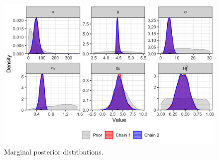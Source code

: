 \documentclass[]{article}
\begin{document}
\begin{doublespace}
\begin{figure}[H]
	\centering
		\includegraphics[width=\linewidth]{figures/poumm_parameter_estimates.png}
		\caption{Marginal posterior distributions.}
\label{fig:poumm-parameters}
\end{figure}


\end{doublespace}
\end{document}
